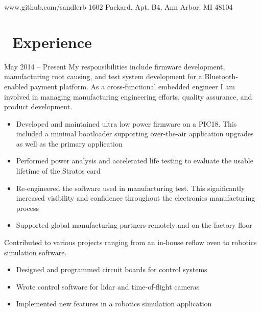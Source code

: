 \documentclass{resume}
\begin{document}


            {www.github.com/sandlerb}
            {1602 Packard, Apt. B4, Ann Arbor, MI 48104}
 
\section{\faWrench\ Experience}
          {May 2014 -- Present}
My responsibilities include firmware development, manufacturing
root causing, and test system development for a Bluetooth-enabled payment
platform.  As a cross-functional embedded engineer I am involved in managing
manufacturing engineering efforts, quality assurance, and product development.
\begin{itemize}
  \item Developed and maintained ultra low power firmware on a PIC18. This
      included a minimal bootloader supporting over-the-air application
      upgrades as well as the primary application
  \item Performed power analysis and accelerated life testing to evaluate the
      usable lifetime of the Stratos card
  \item Re-engineered the software used in manufacturing test. This 
      significantly increased visibility and confidence throughout the 
      electronics manufacturing process
  \item Supported global manufacturing partners remotely and on the factory floor
\end{itemize}
\vspace{3mm}

Contributed to various projects ranging from an in-house reflow oven to robotics
simulation software.
\begin{itemize}
  \item Designed and programmed circuit boards for control systems
  \item Wrote control software for lidar and time-of-flight cameras
  \item Implemented new features in a robotics simulation application
\end{itemize}
\vspace{3mm}
\end{document}
